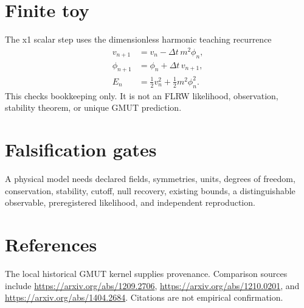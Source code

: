 \documentclass[11pt]{article}
\begin{document}
\section{Finite toy}
The x1 scalar step uses the dimensionless harmonic teaching recurrence
\begin{align}
v_{n+1}&=v_n-\Delta t\,m^2\phi_n,\\
\phi_{n+1}&=\phi_n+\Delta t\,v_{n+1},\\
E_n&=\tfrac12v_n^2+\tfrac12m^2\phi_n^2.
\end{align}
This checks bookkeeping only. It is not an FLRW likelihood, observation, stability theorem, or unique GMUT prediction.
\section{Falsification gates}
A physical model needs declared fields, symmetries, units, degrees of freedom, conservation, stability, cutoff, null recovery, existing bounds, a distinguishable observable, preregistered likelihood, and independent reproduction.
\section{References}
The local historical GMUT kernel supplies provenance. Comparison sources include \url{https://arxiv.org/abs/1209.2706}, \url{https://arxiv.org/abs/1210.0201}, and \url{https://arxiv.org/abs/1404.2684}. Citations are not empirical confirmation.
\end{document}
